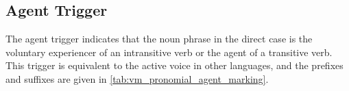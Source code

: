 \documentclass[grammar]{subfiles}
\begin{document}
% 
% 
% 

 
\subsection{Agent Trigger}
\label{ssec:vm_agt_trigger}

The agent trigger indicates that the noun phrase in the direct case is the
voluntary experiencer of an intransitive verb or the agent of a transitive
verb.  This trigger is equivalent to the active voice in other languages, and
the prefixes and suffixes are given in \cref{tab:vm_pronomial_agent_marking}.
\end{document}
